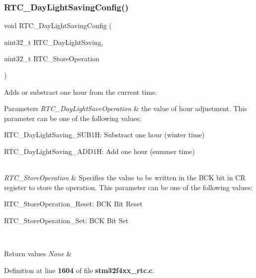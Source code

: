 \subsubsection{R\+T\+C\+\_\+\+Day\+Light\+Saving\+Config()}
{\footnotesize\ttfamily void R\+T\+C\+\_\+\+Day\+Light\+Saving\+Config (\begin{DoxyParamCaption}\item[{uint32\+\_\+t}]{R\+T\+C\+\_\+\+Day\+Light\+Saving,  }\item[{uint32\+\_\+t}]{R\+T\+C\+\_\+\+Store\+Operation }\end{DoxyParamCaption})}



Adds or substract one hour from the current time. 


\begin{DoxyParams}{Parameters}
{\em R\+T\+C\+\_\+\+Day\+Light\+Save\+Operation} & the value of hour adjustment. This parameter can be one of the following values\+: \begin{DoxyItemize}
\item R\+T\+C\+\_\+\+Day\+Light\+Saving\+\_\+\+S\+U\+B1H\+: Substract one hour (winter time) \item R\+T\+C\+\_\+\+Day\+Light\+Saving\+\_\+\+A\+D\+D1H\+: Add one hour (summer time) \end{DoxyItemize}
\\
\hline
{\em R\+T\+C\+\_\+\+Store\+Operation} & Specifies the value to be written in the B\+CK bit in CR register to store the operation. This parameter can be one of the following values\+: \begin{DoxyItemize}
\item R\+T\+C\+\_\+\+Store\+Operation\+\_\+\+Reset\+: B\+CK Bit Reset \item R\+T\+C\+\_\+\+Store\+Operation\+\_\+\+Set\+: B\+CK Bit Set \end{DoxyItemize}
\\
\hline
\end{DoxyParams}

\begin{DoxyRetVals}{Return values}
{\em None} & \\
\hline
\end{DoxyRetVals}


Definition at line \textbf{ 1604} of file \textbf{ stm32f4xx\+\_\+rtc.\+c}.


